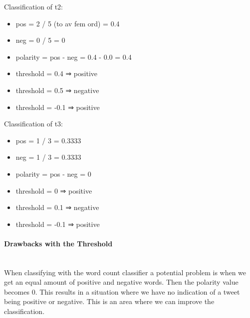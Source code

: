 Classification of t2:
\begin{itemize}
    \item pos = 2 / 5 (to av fem ord) = 0.4
    \item neg = 0 / 5 = 0
    \item polarity = pos - neg = 0.4 - 0.0 = 0.4
    \item threshold = 0.4 ⇒ positive
    \item threshold = 0.5 ⇒ negative
    \item threshold = -0.1 ⇒ positive
\end{itemize}

Classification of t3:
\begin{itemize}
    \item pos = 1 / 3 = 0.3333
    \item neg = 1 / 3 = 0.3333
    \item polarity = pos - neg = 0
    \item threshold = 0 ⇒ positive
    \item threshold = 0.1 ⇒ negative
    \item threshold = -0.1 ⇒ positive
\end{itemize}

\paragraph{Drawbacks with the Threshold}
\hspace{0pt}\\
When classifying with the word count classifier a potential problem is when we
get an equal amount of positive and negative words. Then the polarity value
becomes 0. This results in a situation where we have no indication of a tweet
being positive or negative. This is an area where we can improve the
classification. 

